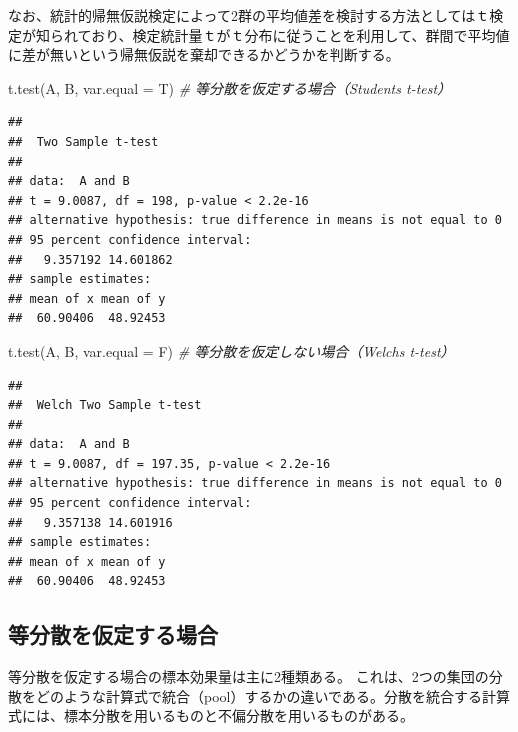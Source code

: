 \documentclass[
  ja=standard, xelatex, base=12pt]{bxjsreport}
\newenvironment{Shaded}{\begin{snugshade}}{\end{snugshade}}
\newcommand{\AttributeTok}[1]{\textcolor[rgb]{0.77,0.63,0.00}{#1}}
\newcommand{\CommentTok}[1]{\textcolor[rgb]{0.56,0.35,0.01}{\textit{#1}}}
\newcommand{\FunctionTok}[1]{\textcolor[rgb]{0.00,0.00,0.00}{#1}}
\newcommand{\NormalTok}[1]{#1}
\begin{document}
なお、統計的帰無仮説検定によって2群の平均値差を検討する方法としてはｔ検定が知られており、検定統計量ｔがｔ分布に従うことを利用して、群間で平均値に差が無いという帰無仮説を棄却できるかどうかを判断する。

\begin{Shaded}
\begin{Highlighting}[]
\FunctionTok{t.test}\NormalTok{(A, B, }\AttributeTok{var.equal =}\NormalTok{ T) }\CommentTok{\# 等分散を仮定する場合（Student\textquotesingle{}s t{-}test）}
\end{Highlighting}
\end{Shaded}

\begin{verbatim}
## 
##  Two Sample t-test
## 
## data:  A and B
## t = 9.0087, df = 198, p-value < 2.2e-16
## alternative hypothesis: true difference in means is not equal to 0
## 95 percent confidence interval:
##   9.357192 14.601862
## sample estimates:
## mean of x mean of y 
##  60.90406  48.92453
\end{verbatim}

\begin{Shaded}
\begin{Highlighting}[]
\FunctionTok{t.test}\NormalTok{(A, B, }\AttributeTok{var.equal =}\NormalTok{ F) }\CommentTok{\# 等分散を仮定しない場合（Welch\textquotesingle{}s t{-}test）}
\end{Highlighting}
\end{Shaded}

\begin{verbatim}
## 
##  Welch Two Sample t-test
## 
## data:  A and B
## t = 9.0087, df = 197.35, p-value < 2.2e-16
## alternative hypothesis: true difference in means is not equal to 0
## 95 percent confidence interval:
##   9.357138 14.601916
## sample estimates:
## mean of x mean of y 
##  60.90406  48.92453
\end{verbatim}

\hypertarget{ux7b49ux5206ux6563ux3092ux4eeeux5b9aux3059ux308bux5834ux5408-1}{%
\subsection{等分散を仮定する場合}\label{ux7b49ux5206ux6563ux3092ux4eeeux5b9aux3059ux308bux5834ux5408-1}}

等分散を仮定する場合の標本効果量は主に2種類ある。 これは、2つの集団の分散をどのような計算式で統合（pool）するかの違いである。分散を統合する計算式には、標本分散を用いるものと不偏分散を用いるものがある。
\end{document}
